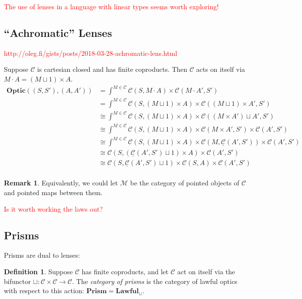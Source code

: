 \documentclass[11pt,a4paper]{article}
\theoremstyle{plain}
\theoremstyle{definition}
\newtheorem{definition}[theorem]{Definition}
\newtheorem{remark}[theorem]{Remark}
\newcommand{\C}{\mathscr{C}}
\newcommand{\homC}{\underline{\C}}
\newcommand{\M}{\mathscr{M}}
\newcommand{\Optic}{\mathbf{Optic}}
\newcommand{\Lawful}{\mathbf{Lawful}}
\newcommand{\Prism}{\mathbf{Prism}}
\newcommand{\todo}[1]{\textcolor{red}{\small #1}}
\begin{document}
\todo{The use of lenses in a language with linear types seems worth exploring!}

\subsection{``Achromatic'' Lenses}
\todo{http://oleg.fi/gists/posts/2018-03-28-achromatic-lens.html}

Suppose $\C$ is cartesian closed and has finite coproducts. Then $\C$ acts on itself via $M \cdot A = (M \sqcup 1) \times A$.
\begin{align*}
\Optic((S, S'), (A, A')) 
&= \int^{M \in \C} \C(S, M \cdot A) \times \C(M \cdot A', S') \\
&= \int^{M \in \C} \C(S, (M \sqcup 1) \times A) \times \C((M \sqcup 1) \times A', S') \\
&\cong \int^{M \in \C} \C(S, (M \sqcup 1) \times A) \times \C((M \times A') \sqcup A', S') \\
&\cong \int^{M \in \C} \C(S, (M \sqcup 1) \times A) \times \C(M \times A', S') \times \C(A', S') \\
&\cong \int^{M \in \C} \C(S, (M \sqcup 1) \times A) \times \C(M, \homC(A', S')) \times \C(A', S') \\
&\cong \C(S, (\homC(A', S') \sqcup 1) \times A) \times \C(A', S') \\
&\cong \C(S, \homC(A', S') \sqcup 1) \times \C(S, A) \times \C(A', S') \\
\end{align*}

\begin{remark}
Equivalently, we could let $\M$ be the category of pointed objects of $\C$ and pointed maps between them.
\end{remark}

\todo{Is it worth working the laws out?}

\subsection{Prisms}
Prisms are dual to lenses:

\begin{definition}
Suppose $\C$ has finite coproducts, and let $\C$ act on itself via the bifunctor $\sqcup : \C \times \C \to \C$. The \emph{category of prisms} is the category of lawful optics with respect to this action: $\Prism = \Lawful_\sqcup$.
\end{definition}
\end{document}
